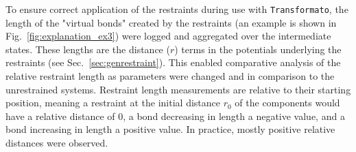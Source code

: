 \documentclass[oneside]{scrreprt}
\begin{document}
To ensure correct application of the restraints during use with \texttt{Transformato}, the length of the "virtual bonds" created by the restraints (an example is shown in Fig.\ \ref{fig:explanation_ex3}) were logged and aggregated over the intermediate states. These lengths are the distance ($r$) terms in the potentials underlying the restraints (see Sec.~\ref{sec:genrestraint}). This enabled comparative analysis of the relative restraint length as parameters were changed and in comparison to the unrestrained systems. Restraint length measurements are relative to their starting position, meaning a restraint at the initial distance $r_0$ of the components would have a relative distance of 0, a bond decreasing in length a negative value, and a bond increasing in length a positive value. In practice, mostly positive relative distances were observed.
\end{document}
